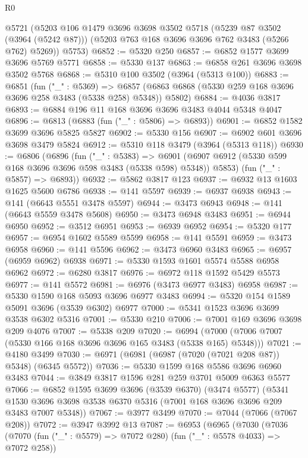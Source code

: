 \begin{lexlean}{R0}
\begin{coremodule}
      @5721
      (@5203
        @106
        @1479
        @3696
        @3698
        @3502
        @5718
        (@5239 @87 @3502 (@3964 (@5242 @87)))
        (@5203 @763 @168 @3696 @3696 @762 @3483 (@5266 @762) @5269))
      @5753)
@6852 := @5320 @250
@6857 := @6852 @1577 @3699 @3696 @5769 @5771
@6858 := @5330 @137
@6863 := @6858 @261 @3696 @3698 @3502 @5768
@6868 := @5310 @100 @3502 (@3964 (@5313 @100))
@6883 := @6851
    (fun ("_" : @5369) =>
    @6857 (@6863 @6868 (@5330 @259 @168 @3696 @3696 @258 @3483 (@5338 @258) @5348)) @5802)
@6884 := @4036 @3817
@6893 := @6884 @196 @11 @168 @3696 @3696 @3483 @4044 @5348 @4047
@6896 := @6813 (@6883 (fun ("_" : @5806) => @6893))
@6901 := @6852 @1582 @3699 @3696 @5825 @5827
@6902 := @5330 @156
@6907 := @6902 @601 @3696 @3698 @3479 @5824
@6912 := @5310 @118 @3479 (@3964 (@5313 @118))
@6930 := @6806
    (@6896
      (fun ("_" : @5383) =>
      @6901 (@6907 @6912 (@5330 @599 @168 @3696 @3696 @598 @3483 (@5338 @598) @5348)) @5853)
      (fun ("_" : @5857) => @6893))
@6932 := @5862 @3817 @123
@6937 := @6932 @13 @1603 @1625 @5600 @6786
@6938 := @141 @5597
@6939 := @6937 @6938
@6943 := @141 (@6643 @5551 @3478 @5597)
@6944 := @3473 @6943
@6948 := @141 (@6643 @5559 @3478 @5608)
@6950 := @3473 @6948 @3483
@6951 := @6944 @6950
@6952 := @3512 @6951
@6953 := @6939 @6952
@6954 := @5320 @177
@6957 := @6954 @1602 @5589 @5599
@6958 := @141 @5591
@6959 := @3473 @6958
@6960 := @141 @5596
@6962 := @3473 @6960 @3483
@6965 := @6957 (@6959 @6962) @6938
@6971 := @5330 @1593 @1601 @5574 @5588 @6958 @6962
@6972 := @6280 @3817
@6976 := @6972 @118 @1592 @5429 @5573
@6977 := @141 @5572
@6981 := @6976 (@3473 @6977 @3483) @6958
@6987 := @5330 @1590 @168 @5093 @3696 @6977 @3483
@6994 := @5320 @154 @1589 @5091 @3696 (@3539 @6302) @6977
@7000 := @5341 @1523 @3696 @3699 @3538 @6302 @5316
@7001 := @5330 @210
@7006 := @7001 @169 @3696 @3698 @209 @4076
@7007 := @5338 @209
@7020 := @6994 (@7000 (@7006 @7007 (@5330 @166 @168 @3696 @3696 @165 @3483 (@5338 @165) @5348)))
@7021 := @4180 @3499
@7030 := @6971 (@6981 (@6987 (@7020 (@7021 @208 @87)) @5348) (@6345 @5572))
@7036 := @5330 @1599 @168 @5586 @3696 @6960 @3483
@7044 := @3849 @3817 @1596 @281 @259 @3701 @5009 @6363 @5577
@7066 := @6852
    @1595
    @3699
    @3696
    (@3539 @6370)
    (@3474 @5577)
    (@5341 @1530 @3696 @3698 @3538 @6370 @5316 (@7001 @168 @3696 @3696 @209 @3483 @7007 @5348))
@7067 := @3977 @3499
@7070 := @7044 (@7066 (@7067 @208))
@7072 := @3947 @3992 @13
@7087 := @6953
    (@6965
      (@7030
        (@7036
          (@7070 (fun ("_" : @5579) => @7072 @280) (fun ("_" : @5578 @4033) => @7072 @258))

\end{coremodule}
\end{lexlean}
